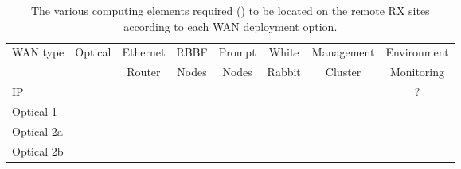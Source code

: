 \newcommand{\cmy}{\checkmark}
\begin{table}[h!]
\centering
\begin{tabular}{l|ccccccc}
{WAN type} & {Optical} & {Ethernet} & {RBBF} & {Prompt} & {White} & {Management} & {Environment} \\
           &  & Router & Nodes & Nodes & Rabbit & {Cluster} & Monitoring \\ \hline
IP         & & \cmy & \cmy & \cmy & \cmy & \cmy & ? \\
Optical 1  & \cmy & \cmy & \cmy & & \cmy & \cmy & \\
Optical 2a & \cmy & \cmy & & & \cmy & & \\
Optical 2b & \cmy &   & & & \cmy & & \\
\end{tabular}
\caption{The various computing \einfra elements required (\cmy) to be located on the remote RX sites according to each WAN deployment option.\label{tab:site-computing}}
\end{table}